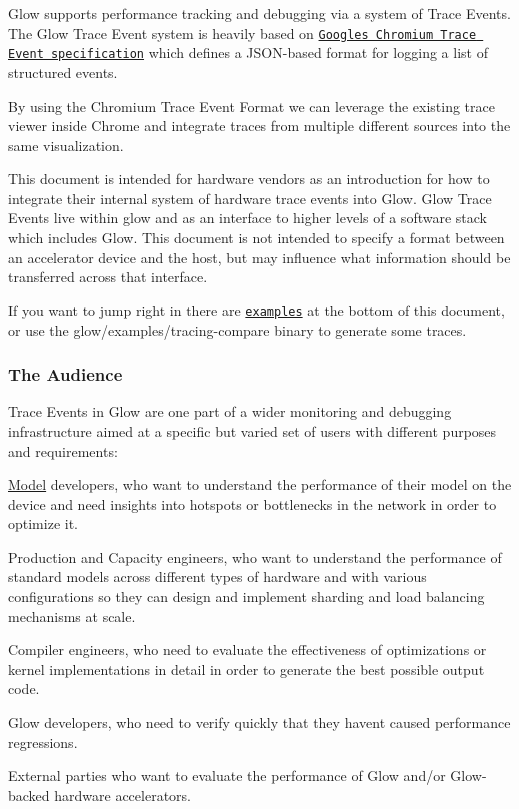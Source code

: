 Glow supports performance tracking and debugging via a system of Trace Events. The Glow Trace Event system is heavily based on \href{https://docs.google.com/document/d/1CvAClvFfyA5R-PhYUmn5OOQtYMH4h6I0nSsKchNAySU}{\tt Google\textquotesingle{}s Chromium Trace Event specification} which defines a J\+S\+O\+N-\/based format for logging a list of structured events.

By using the Chromium Trace Event Format we can leverage the existing trace viewer inside Chrome and integrate traces from multiple different sources into the same visualization.

This document is intended for hardware vendors as an introduction for how to integrate their internal system of hardware trace events into Glow. Glow Trace Events live within glow and as an interface to higher levels of a software stack which includes Glow. This document is not intended to specify a format between an accelerator device and the host, but may influence what information should be transferred across that interface.

If you want to jump right in there are \href{#examples}{\tt examples} at the bottom of this document, or use the glow/examples/tracing-\/compare binary to generate some traces.

\subsubsection*{The Audience}

Trace Events in Glow are one part of a wider monitoring and debugging infrastructure aimed at a specific but varied set of users with different purposes and requirements\+:


\begin{DoxyItemize}
\item \hyperlink{struct_model}{Model} developers, who want to understand the performance of their model on the device and need insights into hotspots or bottlenecks in the network in order to optimize it.
\item Production and Capacity engineers, who want to understand the performance of standard models across different types of hardware and with various configurations so they can design and implement sharding and load balancing mechanisms at scale.
\item Compiler engineers, who need to evaluate the effectiveness of optimizations or kernel implementations in detail in order to generate the best possible output code.
\item Glow developers, who need to verify quickly that they haven\textquotesingle{}t caused performance regressions.
\item External parties who want to evaluate the performance of Glow and/or Glow-\/backed hardware accelerators.
\end{DoxyItemize}

